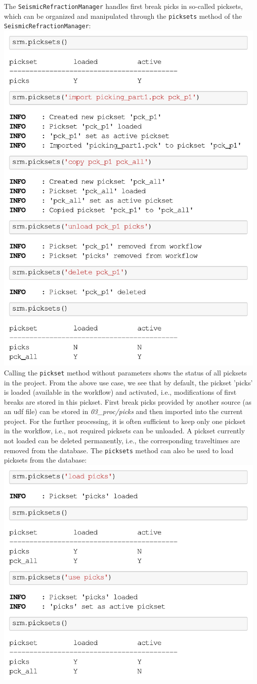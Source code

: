 \documentclass[a4paper,fleqn]{cas-sc}
\begin{document}
The \texttt{SeismicRefractionManager} handles first break picks in so-called picksets, which can be organized and manipulated through the \texttt{picksets} method of the \texttt{SeismicRefractionManager}:
\newline
\includegraphics[width=.5\textwidth]{./figures/picksets.pdf}
\newline
Calling the \texttt{pickset} method without parameters shows the status of all picksets in the project. From the above use case, we see that by default, the pickset 'picks' is loaded (available in the workflow) and activated, i.e., modifications of first breaks are stored in this pickset. First break picks provided by another source (as an udf file) can be stored in \textit{03\_proc/picks} and then imported into the current project.
For the further processing, it is often sufficient to keep only one pickset in the workflow, i.e., not required picksets can be unloaded. A pickset currently not loaded can be deleted permanently, i.e., the corresponding traveltimes are removed from the database. The \texttt{picksets} method can also be used to load picksets from the database:
\newline
\includegraphics[width=.5\textwidth]{./figures/load_picksets.pdf}
\end{document}
